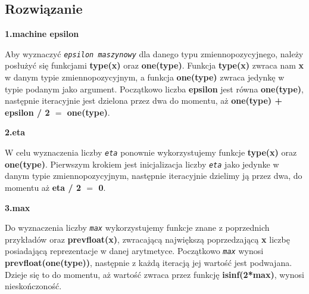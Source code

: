\documentclass{article}
\begin{document}
\begin{center}
    \subsection{Rozwiązanie}
    \begin{flushleft}
        \large \textbf{1.machine epsilon}
    \end{flushleft}
     Aby wyznaczyć \texttt{\textit{epsilon maszynowy}} dla danego typu zmiennopozycyjnego, należy posłużyć się funkcjami \textbf{type(x)} oraz \textbf{one(type)}.
     Funkcja \textbf{type(x)} zwraca nam \textbf{x} w danym typie zmiennopozycyjnym, a funkcja \textbf{one(type)} zwraca jedynkę w typie podanym jako argument.
     Początkowo liczba \textbf{epsilon} jest równa \textbf{one(type)}, następnie iteracyjnie jest dzielona przez dwa do momentu, aż \newline
     \textbf{one(type) + epsilon / 2 \(=\) one(type)}.
     \begin{flushleft}
        \large \textbf{2.eta}
    \end{flushleft}
     W celu wyznaczenia liczby \texttt{\textit{eta}} ponownie wykorzystujemy funkcje \textbf{type(x)} oraz \textbf{one(type)}.
     Pierwszym krokiem jest inicjalizacja liczby \texttt{\textit{eta}} jako jedynke w danym typie zmiennopozycyjnym,
     następnie iteracyjnie dzielimy ją przez dwa, do momentu aż \textbf{eta / 2 \(=\) 0}.
     \begin{flushleft}
        \large \textbf{3.max}
    \end{flushleft}
     Do wyznaczenia liczby \texttt{\textit{max}} wykorzystujemy funkcje znane z poprzednich przykładów oraz
     \textbf{prevfloat(x)}, zwracającą największą poprzedzającą \textbf{x} liczbę posiadającą reprezentacje w danej arytmetyce.
     Początkowo \texttt{\textit{max}} wynosi \textbf{prevfloat(one(type))}, następnie z każdą iteracją jej wartość jest podwajana.
     Dzieje się to do momentu, aż wartość zwraca przez funkcję \textbf{isinf(2*max)}, wynosi nieskończoność.

\end{center}
\end{document}
